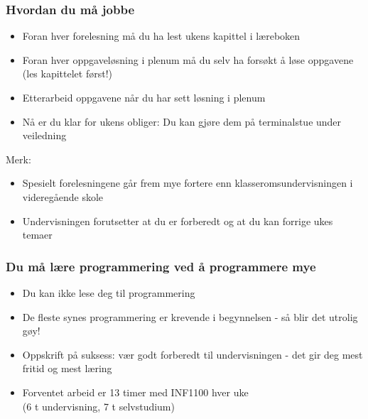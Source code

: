 \documentclass{beamer}
\begin{document}
\begin{frame}
\frametitle{Hvordan du må jobbe}

\pause
\begin{block}{}
\begin{itemize}
  \item Foran hver forelesning må du ha lest ukens kapittel i læreboken

  \item Foran hver oppgaveløsning i plenum må du selv ha forsøkt å løse oppgavene (les kapittelet først!)

  \item Etterarbeid oppgavene når du har sett løsning i plenum

  \item Nå er du klar for ukens obliger: Du kan gjøre dem på terminalstue
    under veiledning
\end{itemize}

\noindent
\end{block}

\begin{block}{Merk: }
\begin{itemize}
  \item Spesielt forelesningene går frem mye fortere enn klasseromsundervisningen i videregående skole

  \item Undervisningen forutsetter at du er forberedt og at du kan forrige ukes temaer
\end{itemize}

\noindent
\end{block}
\end{frame}

\begin{frame}
\frametitle{Du må lære programmering ved å programmere mye}

\begin{block}{}
\begin{itemize}
  \item Du kan ikke lese deg til programmering

  \item De fleste synes programmering er krevende i begynnelsen - så blir det utrolig gøy!

  \item Oppskrift på suksess: vær godt forberedt til undervisningen - det gir deg mest fritid og mest læring

  \item Forventet arbeid er 13 timer med INF1100 hver uke \\
    (6 t undervisning, 7 t selvstudium)
\end{itemize}

\noindent
\end{block}
\end{frame}
\end{document}
